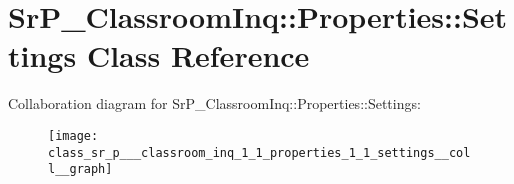 \hypertarget{class_sr_p___classroom_inq_1_1_properties_1_1_settings}{
\section{\-Sr\-P\-\_\-\-Classroom\-Inq\-:\-:\-Properties\-:\-:\-Settings \-Class \-Reference}
\label{class_sr_p___classroom_inq_1_1_properties_1_1_settings}
}


\-Collaboration diagram for \-Sr\-P\-\_\-\-Classroom\-Inq\-:\-:\-Properties\-:\-:\-Settings\-:\nopagebreak
\begin{figure}[H]
\begin{center}
\leavevmode
\texttt{[image: class\_sr\_p\_\_\_classroom\_inq\_1\_1\_properties\_1\_1\_settings\_\_coll\_\_graph]}
\end{center}
\end{figure}
